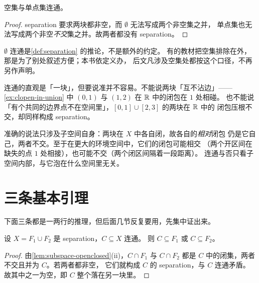 \begin{proposition}
  \label{prop:empty-connected}
  空集与单点集连通。
\end{proposition}

\begin{proof}
  separation 要求两块都非空，而 \(\emptyset\) 无法写成两个非空集之并，
  单点集也无法写成两个非空\emph{不交}集之并。故两者都没有 separation。
\end{proof}

\begin{remark}
  \(\emptyset\) 连通是\cref{def:separation} 的推论，不是额外的约定。
  有的教材把空集排除在外，那是为了别处叙述方便；本书依定义办，
  后文凡涉及空集处都按这个口径，不再另作声明。
\end{remark}

\begin{intuition}
  连通的直观是「一块」，但要说准并不容易。不能说两块「互不沾边」——
  \cref{ex:clopen-in-union} 中 \((0,1)\) 与 \((1,2)\) 在 \(\mathbb{R}\) 中的闭包在 \(1\) 处相碰。
  也不能说「有个共同的边界点不在空间里」，\([0,1] \cup [2,3]\) 的两块在 \(\mathbb{R}\) 中的
  闭包压根不交，却同样构成 separation。

  准确的说法只涉及子空间自身：两块在 \(X\) 中各自闭，故各自的\emph{相对}闭包
  仍是它自己，两者不交。至于在更大的环境空间中，它们的闭包可能相交
  （两个开区间在缺失的点 \(1\) 处相接），也可能不交（两个闭区间隔着一段距离）。
  连通与否只看子空间内部，与它泡在什么空间里无关。
\end{intuition}

\section{三条基本引理}
\label{sec:connected-lemmas}

下面三条都是一两行的推理，但后面几节反复要用，先集中证出来。

\begin{lemma}[连通子集落在一块中]
  \label{lem:connected-in-one-piece}
  设 \(X = F_{1} \cup F_{2}\) 是 separation，\(C \subseteq X\) 连通。
  则 \(C \subseteq F_{1}\) 或 \(C \subseteq F_{2}\)。
\end{lemma}

\begin{proof}
  由\cref{lem:subspace-openclosed}(ii)，\(C \cap F_{1}\) 与 \(C \cap F_{2}\)
  都是 \(C\) 中的闭集，两者不交且并为 \(C\)。若两者都非空，
  它们就构成 \(C\) 的 separation，与 \(C\) 连通矛盾。
  故其中之一为空，即 \(C\) 整个落在另一块里。
\end{proof}

